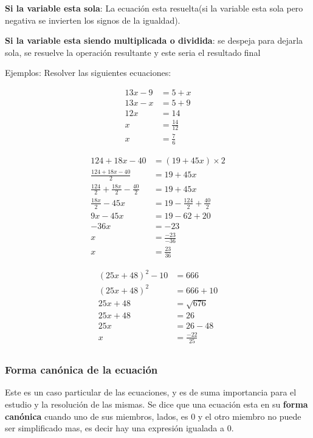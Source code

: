 \begin{itemize}
        \textbf{Si la variable esta sola}: La ecuación esta resuelta(si la variable
        esta sola pero negativa se invierten los signos de la igualdad).

        \textbf{Si la variable esta siendo multiplicada o dividida}: se despeja
        para dejarla sola, se resuelve la operación resultante y este seria el
        resultado final
\end{itemize}

    Ejemplos: Resolver las siguientes ecuaciones:

    \begin{align*}
        13x - 9 &=5 + x		\\
        13x -x &= 5 +9\\
        12x &= 14 \\
        x &= \frac{14}{12} \\
        x&= \frac{7}{6}
    \end{align*}

    \begin{align*}
        124 + 18x -40 &= (19+45x)\times2 		\\
        \frac{124+18x-40}{2}&= 19 + 45x\\
        \frac{124}{2} +\frac{18x}{2} - \frac{40}{2}  &= 19 +45x\\
        \frac{18x}{2} -45x &= 19-\frac{124}{2} +\frac{40}{2} \\
        9x -45x &= 19-62+20\\
        -36x &=-23\\
        x &= \frac{-23}{-36} \\
        x &=\frac{23}{36}
    \end{align*}

    \begin{align*}
        (25x + 48)^2 -10 &= 666 \\
        (25x + 48)^2  &= 666+10 \\
        25x +48 &= \sqrt{676}\\
        25x + 48 &= 26 \\
        25x &= 26-48\\
        x &=  \frac{-22}{25}\\
    \end{align*}


\subsubsection{Forma canónica de la ecuación}
    Este es un caso particular de las ecuaciones, y es de suma importancia para
    el estudio y la resolución de las mismas. Se dice que una ecuación esta en
    su \textbf{forma canónica} cuando uno de sus miembros, lados, es 0 y el otro
    miembro no puede ser simplificado mas, es decir
    hay una expresión igualada a 0.

